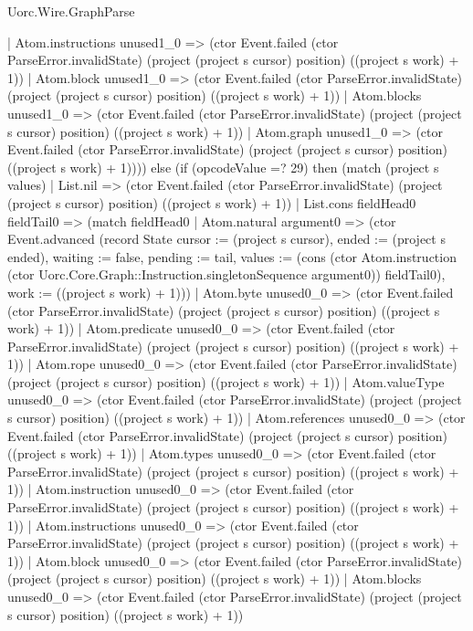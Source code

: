 \begin{lexlean}{Uorc.Wire.GraphParse}
\begin{semanticmodule}
{          | Atom.instructions unused1_0 => (ctor Event.failed (ctor ParseError.invalidState) (project (project s cursor) position) ((project s work) + 1))
          | Atom.block unused1_0 => (ctor Event.failed (ctor ParseError.invalidState) (project (project s cursor) position) ((project s work) + 1))
          | Atom.blocks unused1_0 => (ctor Event.failed (ctor ParseError.invalidState) (project (project s cursor) position) ((project s work) + 1))
          | Atom.graph unused1_0 => (ctor Event.failed (ctor ParseError.invalidState) (project (project s cursor) position) ((project s work) + 1)))) else (if (opcodeValue =? 29) then (match (project s values)
        | List.nil => (ctor Event.failed (ctor ParseError.invalidState) (project (project s cursor) position) ((project s work) + 1))
        | List.cons fieldHead0 fieldTail0 => (match fieldHead0
          | Atom.natural argument0 => (ctor Event.advanced (record State {cursor := (project s cursor), ended := (project s ended), waiting := false, pending := tail, values := (cons (ctor Atom.instruction (ctor Uorc.Core.Graph::Instruction.singletonSequence argument0)) fieldTail0), work := ((project s work) + 1)}))
          | Atom.byte unused0_0 => (ctor Event.failed (ctor ParseError.invalidState) (project (project s cursor) position) ((project s work) + 1))
          | Atom.predicate unused0_0 => (ctor Event.failed (ctor ParseError.invalidState) (project (project s cursor) position) ((project s work) + 1))
          | Atom.rope unused0_0 => (ctor Event.failed (ctor ParseError.invalidState) (project (project s cursor) position) ((project s work) + 1))
          | Atom.valueType unused0_0 => (ctor Event.failed (ctor ParseError.invalidState) (project (project s cursor) position) ((project s work) + 1))
          | Atom.references unused0_0 => (ctor Event.failed (ctor ParseError.invalidState) (project (project s cursor) position) ((project s work) + 1))
          | Atom.types unused0_0 => (ctor Event.failed (ctor ParseError.invalidState) (project (project s cursor) position) ((project s work) + 1))
          | Atom.instruction unused0_0 => (ctor Event.failed (ctor ParseError.invalidState) (project (project s cursor) position) ((project s work) + 1))
          | Atom.instructions unused0_0 => (ctor Event.failed (ctor ParseError.invalidState) (project (project s cursor) position) ((project s work) + 1))
          | Atom.block unused0_0 => (ctor Event.failed (ctor ParseError.invalidState) (project (project s cursor) position) ((project s work) + 1))
          | Atom.blocks unused0_0 => (ctor Event.failed (ctor ParseError.invalidState) (project (project s cursor) position) ((project s work) + 1))
}
\end{semanticmodule}
\end{lexlean}
